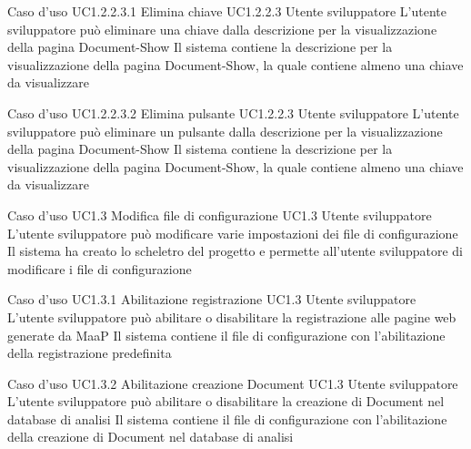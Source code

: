 \UCtitle
{Caso d'uso UC1.2.2.3.1}
{Elimina chiave}
\UC
{UC1.2.2.3}
{Utente sviluppatore}
{L'utente sviluppatore  può eliminare una chiave  dalla descrizione per la visualizzazione della pagina Document-Show}
{Il sistema contiene la descrizione per la visualizzazione della pagina Document-Show, la quale contiene almeno una chiave da visualizzare}

\UCtitle
{Caso d'uso UC1.2.2.3.2}
{Elimina pulsante}
\UC
{UC1.2.2.3}
{Utente sviluppatore}
{L'utente sviluppatore può eliminare un pulsante dalla descrizione per la visualizzazione della pagina Document-Show}
{Il sistema contiene la descrizione per la visualizzazione della pagina Document-Show, la quale contiene almeno una chiave da visualizzare}


\UCtitle
{Caso d'uso UC1.3}
{Modifica file di configurazione}
\UC
{UC1.3}
{Utente sviluppatore}
{L'utente sviluppatore  può modificare varie impostazioni dei file di configurazione}
{Il sistema ha creato lo scheletro del progetto e permette all'utente sviluppatore di modificare i file di configurazione}

\UCtitle
{Caso d'uso UC1.3.1}
{Abilitazione registrazione}
\UC
{UC1.3}
{Utente sviluppatore}
{L'utente sviluppatore può abilitare o disabilitare la registrazione alle pagine web generate da MaaP}
{Il sistema contiene il file di configurazione con l'abilitazione della registrazione predefinita}

\UCtitle
{Caso d'uso UC1.3.2}
{Abilitazione creazione Document}
\UC
{UC1.3}
{Utente sviluppatore}
{L'utente sviluppatore può abilitare o disabilitare la creazione di Document nel database di analisi}
{Il sistema contiene il file di configurazione con l'abilitazione della creazione di Document nel database di analisi}

